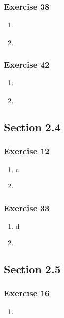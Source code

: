 \documentclass[a4paper]{article}
\newcommand{\ex}[1]{\subsubsection*{#1}}
\begin{document}
\ex{Exercise 38}
\begin{enumerate}[label=\alph*)]
    \item{
    }

    \item{
    }
\end{enumerate}


\ex{Exercise 42}
\begin{enumerate}[label=\alph*)]
    \item{
    }

    \item{
    }
\end{enumerate}


\vspace{2em}
\subsection*{Section 2.4}
\vspace{1em}

\ex{Exercise 12}
\begin{enumerate}[label=\alph*)]
    \item{ c
    }

    \item{
    }
\end{enumerate}


\ex{Exercise 33}
\begin{enumerate}[label=\alph*)]
    \item{ d
    }

    \item{
    }
\end{enumerate}


\vspace{2em}
\subsection*{Section 2.5}
\vspace{1em}

\ex{Exercise 16}
\begin{enumerate}[label=\alph*)]
    \item{
    }
\end{enumerate}


%
\end{document}
